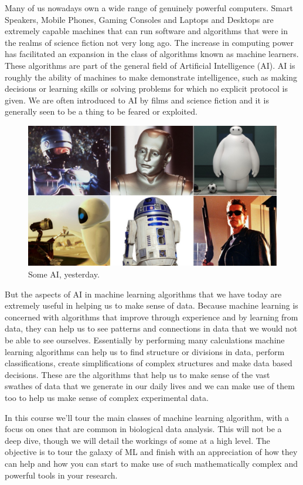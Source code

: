\documentclass[
]{book}
\begin{document}
Many of us nowadays own a wide range of genuinely powerful computers. Smart Speakers, Mobile Phones, Gaming Consoles and Laptops and Desktops are extremely capable machines that can run software and algorithms that were in the realms of science fiction not very long ago. The increase in computing power has facilitated an expansion in the class of algorithms known as machine learners. These algorithms are part of the general field of Artificial Intelligence (AI). AI is roughly the ability of machines to make demonstrate intelligence, such as making decisions or learning skills or solving problems for which no explicit protocol is given. We are often introduced to AI by films and science fiction and it is generally seen to be a thing to be feared or exploited.

\begin{figure}
\centering
\includegraphics{figs/bots.jpeg}
\caption{\label{fig:unnamed-chunk-2}Some AI, yesterday.}
\end{figure}

But the aspects of AI in machine learning algorithms that we have today are extremely useful in helping us to make sense of data. Because machine learning is concerned with algorithms that improve through experience and by learning from data, they can help us to see patterns and connections in data that we would not be able to see ourselves. Essentially by performing many calculations machine learning algorithms can help us to find structure or divisions in data, perform classifications, create simplifications of complex structures and make data based decisions. These are the algorithms that help us to make sense of the vast swathes of data that we generate in our daily lives and we can make use of them too to help us make sense of complex experimental data.

In this course we'll tour the main classes of machine learning algorithm, with a focus on ones that are common in biological data analysis. This will not be a deep dive, though we will detail the workings of some at a high level. The objective is to tour the galaxy of ML and finish with an appreciation of how they can help and how you can start to make use of such mathematically complex and powerful tools in your research.
\end{document}
